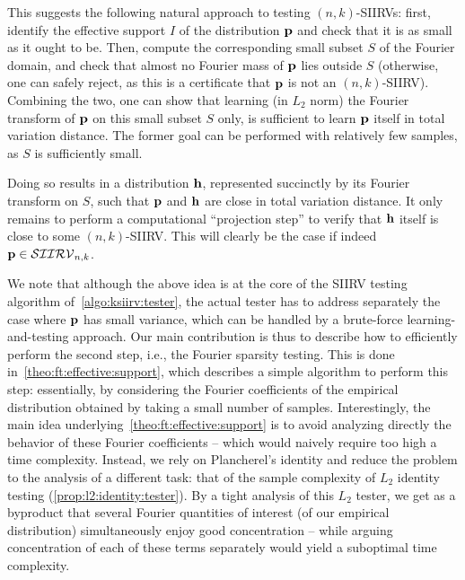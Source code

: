 This suggests the following natural approach to testing $(n,k)$-SIIRVs: first, identify the effective support $I$ of the distribution $\p$ 
and check that it is as small as it ought to be. Then, compute the corresponding small subset $S$ of the Fourier domain, 
and check that almost no Fourier mass of $\p$ lies outside $S$ (otherwise, one can safely reject, as this is a certificate that $\p$ is not an $(n,k)$-SIIRV). 
Combining the two, one can show that learning (in $L_2$ norm) the Fourier transform of $\p$ on this small subset $S$ only, 
is sufficient to learn $\p$ itself in total variation distance. The former goal can be performed with relatively few samples, as $S$ is sufficiently small.

Doing so results in a distribution $\h$, represented succinctly by its Fourier transform on $S$, such that $\p$ and $\h$ are close in total variation distance. 
It only remains to perform a computational ``projection step'' to verify that $\h$ itself is close to some $(n,k)$-SIIRV. 
This will clearly be the case if indeed $\p\in\classksiirv[n]{k}$.

We note that although the above idea is at the core of the SIIRV testing algorithm of~\cref{algo:ksiirv:tester}, 
the actual tester has to address separately the case where $\p$ has small variance, which can be handled by a brute-force learning-and-testing approach. 
Our main contribution is thus to describe how to efficiently perform the second step, i.e., the Fourier sparsity testing. 
This is done in~\cref{theo:ft:effective:support}, which describes a simple algorithm to perform this step: essentially, by considering the Fourier coefficients 
of the empirical distribution obtained by taking a small number of samples. Interestingly, the main idea underlying~\cref{theo:ft:effective:support} 
is to avoid analyzing directly the behavior of these Fourier coefficients -- which would naively require too high a time complexity. 
Instead, we rely on Plancherel's identity and reduce the problem to the analysis of a different task:  
that of the sample complexity of $L_2$ identity testing (\cref{prop:l2:identity:tester}). By a tight analysis of this $L_2$ tester, 
we get as a byproduct that several Fourier quantities of interest (of our empirical distribution) simultaneously enjoy 
good concentration -- while arguing concentration of each of these terms separately would yield a suboptimal time complexity. 

